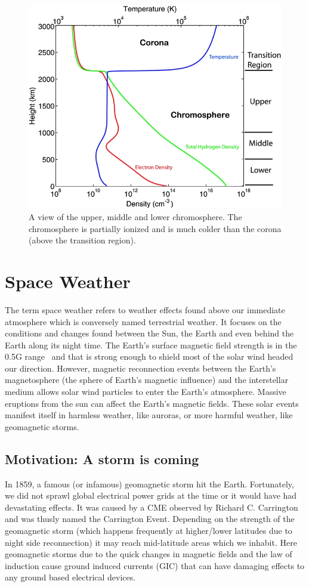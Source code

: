 \documentclass[12pt,upcase]{umlthesis}
\begin{document}
\begin{figure}[ht!]\label{fig:chromoprofile}
	\centering
	\includegraphics[width=0.75\linewidth]{images/chromoprofile.jpg}
	\caption{A view of the upper, middle and lower chromosphere. The chromosphere is partially ionized and is much colder than the corona (above the transition region).~\citep{Song2014,Avrett2008}}
\end{figure}


\section{Space Weather}

The term space weather refers to weather effects found above our immediate atmosphere which is conversely named terrestrial weather. It focuses on the conditions and changes found between the Sun, the Earth and even behind the Earth along its night time. The Earth's surface magnetic field strength is in the 0.5G range~\citep{Finlay2010} and that is strong enough to shield most of the solar wind headed our direction. However, magnetic reconnection events between the Earth's magnetosphere (the sphere of Earth's magnetic influence) and the interstellar medium allows solar wind particles to enter the Earth's atmosphere. Massive eruptions from the sun can affect the Earth's magnetic fields. These solar events manifest itself in harmless weather, like auroras, or more harmful weather, like geomagnetic storms.

\subsection{Motivation: A storm is coming}

In 1859, a famous (or infamous) geomagnetic storm hit the Earth. Fortunately, we did not sprawl global electrical power grids at the time or it would have had devastating effects. It was caused by a CME observed by Richard C. Carrington and was thusly named the Carrington Event. Depending on the strength of the geomagnetic storm (which happens frequently at higher/lower latitudes due to night side reconnection) it may reach mid-latitude areas which we inhabit. Here geomagnetic storms due to the quick changes in magnetic fields and the law of induction cause ground induced currents (GIC) that can have damaging effects to any ground based electrical devices.
\end{document}
